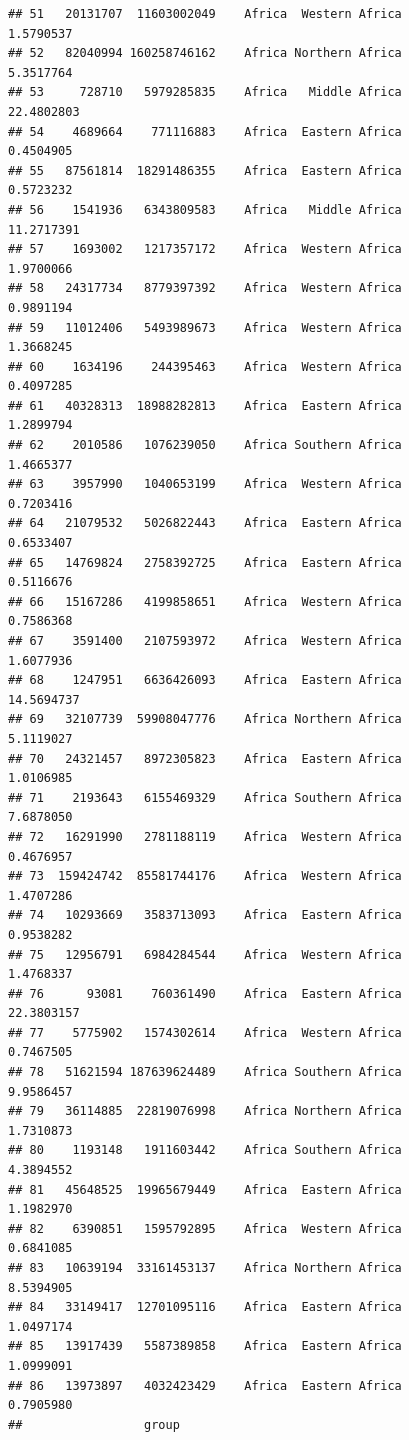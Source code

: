 \documentclass[
]{article}
\begin{document}
\begin{verbatim}
## 51   20131707  11603002049    Africa  Western Africa       1.5790537
## 52   82040994 160258746162    Africa Northern Africa       5.3517764
## 53     728710   5979285835    Africa   Middle Africa      22.4802803
## 54    4689664    771116883    Africa  Eastern Africa       0.4504905
## 55   87561814  18291486355    Africa  Eastern Africa       0.5723232
## 56    1541936   6343809583    Africa   Middle Africa      11.2717391
## 57    1693002   1217357172    Africa  Western Africa       1.9700066
## 58   24317734   8779397392    Africa  Western Africa       0.9891194
## 59   11012406   5493989673    Africa  Western Africa       1.3668245
## 60    1634196    244395463    Africa  Western Africa       0.4097285
## 61   40328313  18988282813    Africa  Eastern Africa       1.2899794
## 62    2010586   1076239050    Africa Southern Africa       1.4665377
## 63    3957990   1040653199    Africa  Western Africa       0.7203416
## 64   21079532   5026822443    Africa  Eastern Africa       0.6533407
## 65   14769824   2758392725    Africa  Eastern Africa       0.5116676
## 66   15167286   4199858651    Africa  Western Africa       0.7586368
## 67    3591400   2107593972    Africa  Western Africa       1.6077936
## 68    1247951   6636426093    Africa  Eastern Africa      14.5694737
## 69   32107739  59908047776    Africa Northern Africa       5.1119027
## 70   24321457   8972305823    Africa  Eastern Africa       1.0106985
## 71    2193643   6155469329    Africa Southern Africa       7.6878050
## 72   16291990   2781188119    Africa  Western Africa       0.4676957
## 73  159424742  85581744176    Africa  Western Africa       1.4707286
## 74   10293669   3583713093    Africa  Eastern Africa       0.9538282
## 75   12956791   6984284544    Africa  Western Africa       1.4768337
## 76      93081    760361490    Africa  Eastern Africa      22.3803157
## 77    5775902   1574302614    Africa  Western Africa       0.7467505
## 78   51621594 187639624489    Africa Southern Africa       9.9586457
## 79   36114885  22819076998    Africa Northern Africa       1.7310873
## 80    1193148   1911603442    Africa Southern Africa       4.3894552
## 81   45648525  19965679449    Africa  Eastern Africa       1.1982970
## 82    6390851   1595792895    Africa  Western Africa       0.6841085
## 83   10639194  33161453137    Africa Northern Africa       8.5394905
## 84   33149417  12701095116    Africa  Eastern Africa       1.0497174
## 85   13917439   5587389858    Africa  Eastern Africa       1.0999091
## 86   13973897   4032423429    Africa  Eastern Africa       0.7905980
##                 group

\end{verbatim}
\end{document}
